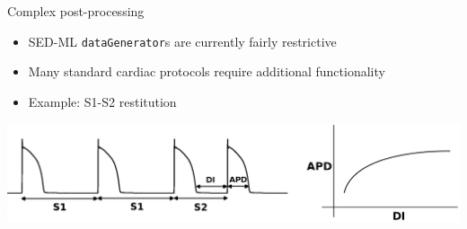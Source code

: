 \documentclass[t,xcolor={usenames,dvipsnames}]{beamer}
\begin{document}
\begin{frame}{Complex post-processing}
\begin{itemize}
\item SED-ML \texttt{dataGenerator}s are currently fairly restrictive
\item Many standard cardiac protocols require additional functionality
\item Example: S1-S2 restitution
\end{itemize}
\includegraphics[width=\textwidth]{S1S2}
\end{frame}
\end{document}
